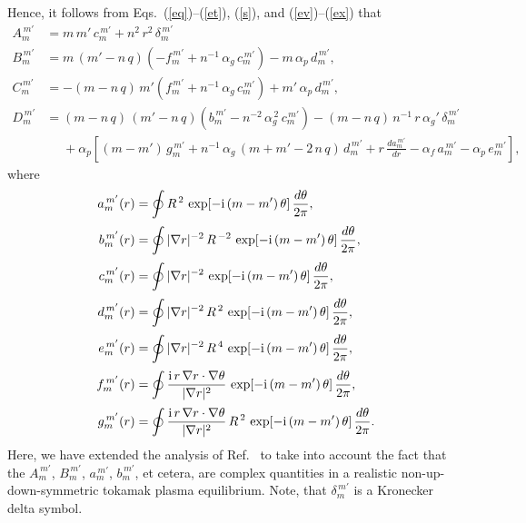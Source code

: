 \documentclass[12pt,prb,aps]{revtex4-1}
\begin{document}
Hence, it follows from Eqs.~(\ref{eq})--(\ref{et}), (\ref{s}), and (\ref{ev})--(\ref{ex}) that\,\cite{am3}
\begin{align}\label{e104}
A_m^{\,m'}&= m\,m'\,c_m^{\,m'} + n^2\,r^2\,\delta_m^{\,m'}\\[0.5ex]
B_m^{\,m'}&= m\,(m'-n\,q)\left(-f_m^{\,m'}+n^{-1}\,\alpha_g\,c_m^{\,m'}\right) -m\,\alpha_p\,d_m^{\,m'},\\[0.5ex]
C_m^{\,m'}&= -(m-n\,q)\,m'\left(f_m^{\,m'}+n^{-1}\,\alpha_g\,c_m^{\,m'}\right)+m'\,\alpha_p\,d_m^{\,m'},\\[0.5ex]
D_m^{\,m'}&= (m-n\,q)\,(m'-n\,q)\left(b_m^{\,m'}-n^{-2}\,\alpha_g^{\,2}\,c_m^{\,m'}\right) - (m-n\,q)\,n^{-1}\,r\,\alpha_g'\,\delta_m^{\,m'}\label{e107}\\[0.5ex]
&\phantom{=} + 
\alpha_p\left[(m-m')\,g_m^{\,m'}+n^{-1}\,\alpha_g\,(m+m'-2\,n\,q)\,d_m^{\,m'} + r\,\frac{d a_m^{\,m'}}{dr}-\alpha_f\,a_m^{\,m'}
-\alpha_p\,e_m^{\,m'}\right],\nonumber
\end{align}
where
\begin{align}\label{e108}
a_m^{\,m'}(r) &= \oint R^{\,2}\,\exp[-{\rm i}\,(m-m')\,\theta]\,\frac{d\theta}{2\pi},\\[0.5ex]
b_m^{\,m'}(r) &= \oint |\nabla r|^{-2}\,R^{\,-2}\,\exp[-{\rm i}\,(m-m')\,\theta]\,\frac{d\theta}{2\pi},\\[0.5ex]
c_m^{\,m'}(r) &= \oint |\nabla r|^{-2}\,\exp[-{\rm i}\,(m-m')\,\theta]\,\frac{d\theta}{2\pi},\\[0.5ex]
d_m^{\,m'}(r) &= \oint |\nabla r|^{-2}\,R^{\,2}\,\exp[-{\rm i}\,(m-m')\,\theta]\,\frac{d\theta}{2\pi},\\[0.5ex]
e_m^{\,m'}(r) &= \oint |\nabla r|^{-2}\,R^{\,4}\,\exp[-{\rm i}\,(m-m')\,\theta]\,\frac{d\theta}{2\pi},\\[0.5ex]
f_m^{\,m'}(r) &= \oint \frac{{\rm i}\,r\,\nabla r\cdot\nabla\theta}{|\nabla r|^2}\,\exp[-{\rm i}\,(m-m')\,\theta]\,\frac{d\theta}{2\pi},\label{fdef}\\[0.5ex]
g_m^{\,m'}(r) &= \oint \frac{{\rm i}\,r\,\nabla r\cdot\nabla\theta}{|\nabla r|^2}\,R^{\,2}\,\exp[-{\rm i}\,(m-m')\,\theta]\,\frac{d\theta}{2\pi}.\label{e114}
\end{align}
Here, we have extended the analysis of Ref.~ to take into account the fact that the $A_m^{\,m'}$, $B_m^{\,m'}$, $a_m^{\,m'}$, $b_m^{\,m'}$, et cetera,
are complex quantities in a realistic non-up-down-symmetric tokamak plasma equilibrium.  Note, that $\delta_m^{\,m'}$ is a Kronecker delta symbol.
\end{document}
